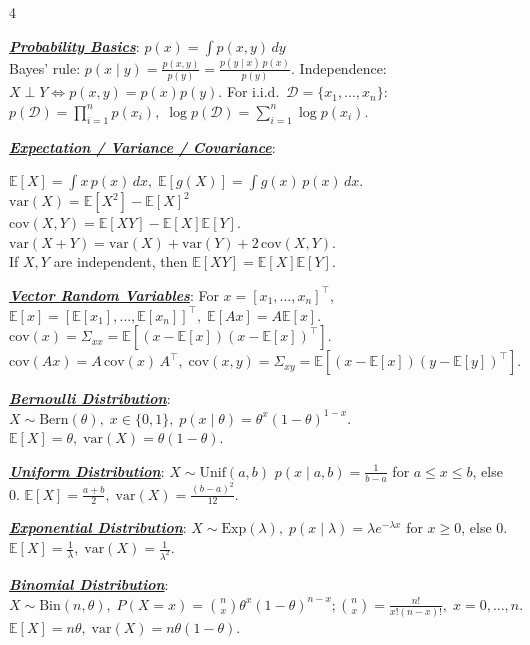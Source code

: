 \documentclass[12pt]{article}
\newcommand{\bulletPoint}[1]{\underline{\textit{\textbf{#1}}}}
\begin{document}
\singlespacing

\begin{multicols*}{4}

\tiny

\raggedright


\bulletPoint{Probability Basics}:
$p(x)=\int p(x,y)\,dy$ \\
Bayes' rule:
$p(x\mid y)=\frac{p(x,y)}{p(y)}=\frac{p(y\mid x)\,p(x)}{p(y)}.$
Independence:
$X\perp Y \iff p(x,y)=p(x)p(y).$
For i.i.d.\ $\mathcal D=\{x_1,\dots,x_n\}$:
$p(\mathcal D)=\prod_{i=1}^n p(x_i),\;
\log p(\mathcal D)=\sum_{i=1}^n \log p(x_i).$

\bulletPoint{Expectation / Variance / Covariance}:

$\mathbb E[X]=\int x\,p(x)\,dx,\;
\mathbb E[g(X)]=\int g(x)\,p(x)\,dx.$\\
$\mathrm{var}(X)=\mathbb E[X^2]-\mathbb E[X]^2$\\
$\mathrm{cov}(X,Y)=\mathbb E[XY]-\mathbb E[X]\mathbb E[Y].$
$\mathrm{var}(X+Y)=\mathrm{var}(X)+\mathrm{var}(Y)+2\,\mathrm{cov}(X,Y).$\\
If $X,Y$ are independent, then
$\mathbb E[XY]=\mathbb E[X]\mathbb E[Y].$

\bulletPoint{Vector Random Variables}:
For $x=[x_1,\dots,x_n]^\top$,
$\mathbb E[x]=[\mathbb E[x_1],\dots,\mathbb E[x_n]]^\top,\;
\mathbb E[Ax]=A\mathbb E[x].$
$\mathrm{cov}(x)=\Sigma_{xx}=\mathbb E[(x-\mathbb E[x])(x-\mathbb E[x])^\top].$
$\mathrm{cov}(Ax)=A\,\mathrm{cov}(x)\,A^\top,\;
\mathrm{cov}(x,y)=\Sigma_{xy}=\mathbb E[(x-\mathbb E[x])(y-\mathbb E[y])^\top].$

\bulletPoint{Bernoulli Distribution}:
$X\sim \mathrm{Bern}(\theta),\; x\in\{0,1\},\;
p(x\mid \theta)=\theta^x(1-\theta)^{1-x}.$
$\mathbb E[X]=\theta,\; \mathrm{var}(X)=\theta(1-\theta).$

\bulletPoint{Uniform Distribution}:
$X\sim \mathrm{Unif}(a,b)$
$p(x\mid a,b)=\frac{1}{b-a}$ for $a\le x\le b$, else $0$.
$\mathbb E[X]=\frac{a+b}{2},\;
\mathrm{var}(X)=\frac{(b-a)^2}{12}.$

\bulletPoint{Exponential Distribution}:
$X\sim \mathrm{Exp}(\lambda),\;
p(x\mid \lambda)=\lambda e^{-\lambda x}$ for $x\ge 0$, else $0$.
$\mathbb E[X]=\frac{1}{\lambda},\;
\mathrm{var}(X)=\frac{1}{\lambda^2}.$

\bulletPoint{Binomial Distribution}:
$X\sim \mathrm{Bin}(n,\theta),\;
P(X=x)=\binom{n}{x}\theta^x(1-\theta)^{n-x}; \binom{n}{x} = \frac{n!}{x!(n-x)!},\; x=0,\dots,n.$
$\mathbb E[X]=n\theta,\; \mathrm{var}(X)=n\theta(1-\theta).$



\end{multicols*}
\end{document}
